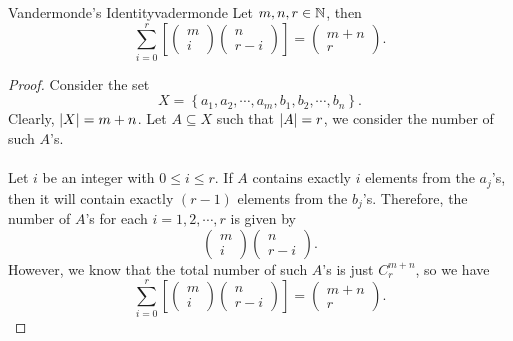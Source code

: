 \documentclass[math]{amznotes}
\theoremstyle{remark}
\newcommand{\0}{\mathbf{0}}
\newcommand{\1}{\mathbf{1}}
\begin{document}
\begin{thmbox}{Vandermonde's Identity}{vadermonde}
    Let $m, n, r \in \mathbb{N}$, then
    \begin{equation*}
        \sum_{i = 0}^{r}\left[\begin{pmatrix}
            m \\
            i
        \end{pmatrix}\begin{pmatrix}
            n \\
            r - i
        \end{pmatrix}\right] = \begin{pmatrix}
            m + n \\
            r
        \end{pmatrix}.
    \end{equation*}
    \tcblower   
    \begin{proof}
        Consider the set
        \begin{displaymath}
            X = \left\{a_1, a_2, \cdots, a_m, b_1, b_2, \cdots, b_n\right\}.
        \end{displaymath}
        Clearly, ${\left\lvert {X} \right\rvert} = m + n$. Let $A \subseteq X$ such that ${\left\lvert {A} \right\rvert} = r$, we consider the number of such $A$'s.
        \\\\
        Let $i$ be an integer with $0 \leq i \leq r$. If $A$ contains exactly $i$ elements from the $a_j$'s, then it will contain exactly $(r - 1)$ elements from the $b_j$'s. Therefore, the number of $A$'s for each $i = 1, 2, \cdots, r$ is given by
        \begin{equation*}
            \begin{pmatrix}
                m \\
                i
            \end{pmatrix}\begin{pmatrix}
                n \\
                r - i
            \end{pmatrix}.
        \end{equation*}
        However, we know that the total number of such $A$'s is just $C^{m + n}_r$, so we have
        \begin{equation*}
            \sum_{i = 0}^{r}\left[\begin{pmatrix}
                m \\
                i
            \end{pmatrix}\begin{pmatrix}
                n \\
                r - i
            \end{pmatrix}\right] = \begin{pmatrix}
                m + n \\
                r
            \end{pmatrix}.
        \end{equation*}
    \end{proof}
\end{thmbox}
\end{document}
